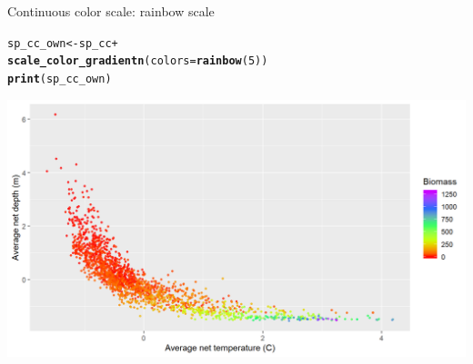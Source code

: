 \documentclass{beamer}\usepackage[]{graphicx}\usepackage[]{color}
\makeatletter
\newcommand{\hlnum}[1]{\textcolor[rgb]{0.686,0.059,0.569}{#1}}%
\newcommand{\hlopt}[1]{\textcolor[rgb]{0,0,0}{#1}}%
\newcommand{\hlstd}[1]{\textcolor[rgb]{0.345,0.345,0.345}{#1}}%
\newcommand{\hlkwb}[1]{\textcolor[rgb]{0.69,0.353,0.396}{#1}}%
\newcommand{\hlkwc}[1]{\textcolor[rgb]{0.333,0.667,0.333}{#1}}%
\newcommand{\hlkwd}[1]{\textcolor[rgb]{0.737,0.353,0.396}{\textbf{#1}}}%
\newenvironment{kframe}{%
 \def\at@end@of@kframe{}%
 \ifinner\ifhmode%
  \def\at@end@of@kframe{\end{minipage}}%
  \begin{minipage}{\columnwidth}%
 \fi\fi%
 \def\FrameCommand##1{\hskip\@totalleftmargin \hskip-\fboxsep
 \colorbox{shadecolor}{##1}\hskip-\fboxsep
     \hskip-\linewidth \hskip-\@totalleftmargin \hskip\columnwidth}%
 \MakeFramed {\advance\hsize-\width
   \@totalleftmargin\z@ \linewidth\hsize
   \@setminipage}}%
 {\par\unskip\endMakeFramed%
 \at@end@of@kframe}
\newenvironment{knitrout}{}{} %
\makeatother
\begin{document}
\begin{frame}[fragile]{Continuous color scale: rainbow scale}
\begin{knitrout}\footnotesize
{}\color{fgcolor}\begin{kframe}
\begin{alltt}
\hlstd{sp_cc_own} \hlkwb{<-} \hlstd{sp_cc} \hlopt{+}
  \hlkwd{scale_color_gradientn}\hlstd{(}\hlkwc{colors} \hlstd{=} \hlkwd{rainbow}\hlstd{(}\hlnum{5}\hlstd{))}
\hlkwd{print}\hlstd{(sp_cc_own)}
\end{alltt}
\end{kframe}

{\centering \includegraphics[width=.9\linewidth]{figure/sp_continuous_color4-1} 

}



\end{knitrout}
\end{frame}
\end{document}

